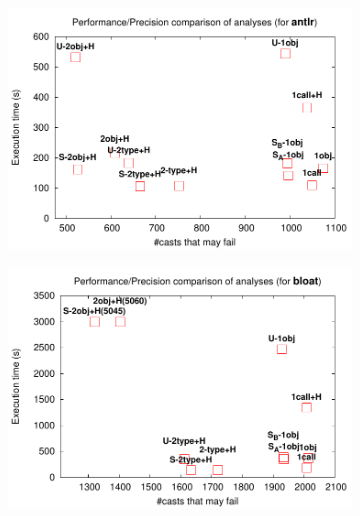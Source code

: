 \begin{figure}[tb!p]
\begin{center}
\begin{subfigure}[b]{0.45\textwidth}
\includegraphics[width=\textwidth]{assets/hybrid/antlr.pdf}
\end{subfigure}\hspace{1cm}%
\begin{subfigure}[b]{0.45\textwidth}
\includegraphics[width=\textwidth]{assets/hybrid/bloat.pdf}
\end{subfigure}


\end{center}
\end{figure}
